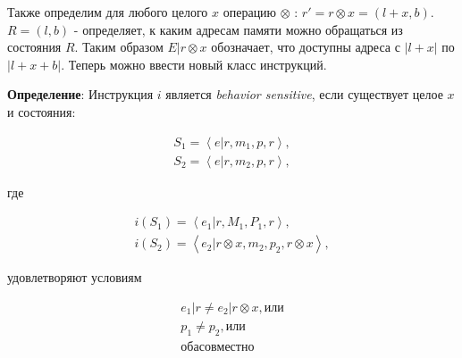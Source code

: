 Также определим для любого целого $x$ операцию $\otimes$ : $r' = r \otimes x = (l+x, b)$. $R=(l, b)$ - определяет, к каким адресам памяти можно обращаться из состояния $R$. Таким образом $E|r \otimes x$ обозначает, что доступны адреса с $|l + x|$ по $|l + x + b|$. Теперь можно ввести новый класс инструкций.

\textbf{Определение}: Инструкция $i$ является \textit{behavior sensitive}, если существует целое $x$ и состояния:

\begin{align*}
S_1=\left<e | r, m_1, p, r\right>, \\
S_2=\left<e | r, m_2, p, r\right>,
\end{align*}

где

\begin{align*}
i(S_1) = \left<e_1 | r, M_1, P_1, r\right>, \\
i(S_2) = \left<e_2 | r \otimes x, m_2, p_2, r \otimes x\right>,
\end{align*}

удовлетворяют условиям

\begin{align*}
e_1 | r \ne e_2 | r \otimes x, или \\
p_1 \ne p_2, или \\
оба совместно
\end{align*}


